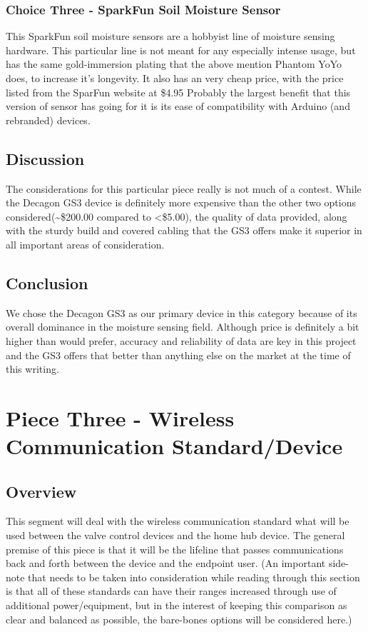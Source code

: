 \documentclass[onecolumn, draftclsnofoot,10pt, compsoc]{IEEEtran}
\begin{document}
    \subsubsection{Choice Three - SparkFun Soil Moisture Sensor}
    This SparkFun soil moisture sensors are a hobbyist line of moisture sensing hardware.
    This particular line is not meant for any especially intense usage, but has the same gold-immersion plating that the above mention Phantom YoYo does, to increase it's longevity.
    It also has an very cheap price, with the price listed from the SparFun website at \$4.95
    Probably the largest benefit that this version of sensor has going for it is its ease of compatibility with Arduino (and rebranded) devices.
    
    \subsection{Discussion}
    The considerations for this particular piece really is not much of a contest.
    While the Decagon GS3 device is definitely more expensive than the other two options considered(\textasciitilde \$200.00 compared to <\$5.00), the quality of data provided, along with the sturdy build and covered cabling that the GS3 offers make it superior in all important areas of consideration.
    
    \subsection{Conclusion}
    We chose the Decagon GS3 as our primary device in this category because of its overall dominance in the moisture sensing field. Although price is definitely a bit higher than would prefer, accuracy and reliability of data are key in this project and the GS3 offers that better than anything else on the market at the time of this writing.
    
    \section{Piece Three - Wireless Communication Standard/Device}
    \subsection{Overview}
    This segment will deal with the wireless communication standard what will be used between the valve control devices and the home hub device.
    The general premise of this piece is that it will be the lifeline that passes communications back and forth between the device and the endpoint user.
    (An important side-note that needs to be taken into consideration while reading through this section is that all of these standards can have their ranges increased through use of additional power/equipment, but in the interest of keeping this comparison as clear and balanced as possible, the bare-bones options will be considered here.)
\end{document}

